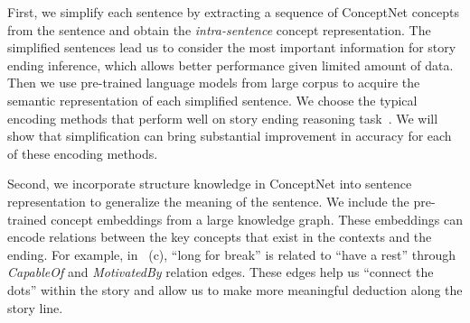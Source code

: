 First, we simplify each sentence by extracting a sequence of
ConceptNet concepts from the sentence
and obtain the {\em intra-sentence} concept representation.
The simplified sentences lead us to consider the most important information
for story ending inference,
which allows better performance
 given limited amount of data.
Then we use pre-trained language models from large corpus
to acquire the
semantic representation of each simplified sentence. 
We choose the typical encoding methods that perform well on story ending 
reasoning task~\cite{roemmele2017rnn,mostafazadeh2016corpus,devlin2018bert}. 
We will show that simplification can bring substantial improvement in 
accuracy for each of these encoding methods.


Second, we incorporate structure knowledge in ConceptNet into sentence representation to 
generalize the meaning of the sentence. 
We include the pre-trained concept 
embeddings from a large knowledge graph. These embeddings can encode 
relations between the key concepts that exist in the contexts and the ending.
For example, in ~(c),  ``long for break'' is related to ``have a rest''
through {\em CapableOf} and {\em MotivatedBy} relation edges.
These edges help us ``connect the dots'' within the story and allow us
to make more meaningful deduction along the story line.


